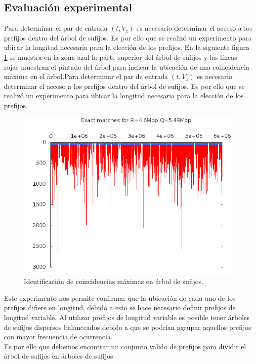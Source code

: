 \documentclass[11pt,a4paper,english]{article}
\begin{document}
\subsection{Evaluación experimental}
Para determinar el par de entrada $(t,V_{z})$ es necesario determinar el acceso a los prefijos dentro del
árbol de sufijos. Es por ello que se realizó un experimento para ubicar la longitud necesaria para la 
elección de los prefijos. En la siguiente figura \ref{fig:top} se muestra en la zona azul la parte superior
del árbol de sufijos y las líneas rojas muestran el pintado del árbol para indicar la ubicación de una 
coincidencia máxima en el árbol.Para determinar el par de entrada $(t,V_{z})$ es necesario determinar el acceso a los prefijos dentro del
árbol de sufijos. Es por ello que se realizó un experimento para ubicar la longitud necesaria para la 
elección de los prefijos. 
\begin{figure}[h]
\begin{center}
\includegraphics[scale=0.4]{freq.png}
\caption{Identificación de coincidencias máximas en árbol de sufijos.}
\label{fig:top}
\end{center}
\end{figure}
Este experimento nos permite confirmar que la ubicación de cada uno de los prefijos difiere en longitud, debido a 
esto se hace necesario definir prefijos de longitud variable. Al utilizar prefijos de longitud variable es posible
tener árboles de sufijos dispersos balanceados debido a que se podrían agrupar aquellos prefijos con mayor frecuencia
de ocurrencia.\\
Es por ello que debemos encontrar un conjunto valido de prefijos para dividir el árbol de sufijos en árboles de sufijos
\end{document}
